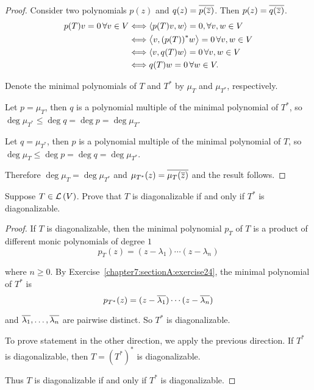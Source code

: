 \begin{proof}
    Consider two polynomials $p(z)$ and $q(z) = \overline{p(\overline{z})}$. Then $p(z) = \overline{q(\overline{z})}$.
    \begin{align*}
        p(T)v = 0\,\forall v\in V & \Longleftrightarrow \left\langle{p(T)v, w}\right\rangle = 0,\forall v, w\in V          \\
                                  & \Longleftrightarrow \left\langle{v, {(p(T))}^{*}w}\right\rangle = 0\,\forall v, w\in V \\
                                  & \Longleftrightarrow \left\langle{v, q(T)w}\right\rangle = 0\,\forall v, w\in V         \\
                                  & \Longleftrightarrow q(T)w = 0\,\forall w\in V.
    \end{align*}

    Denote the minimal polynomials of $T$ and $T^{*}$ by $\mu_{T}$ and $\mu_{T^{*}}$, respectively.

    Let $p = \mu_{T}$, then $q$ is a polynomial multiple of the minimal polynomial of $T^{*}$, so $\deg \mu_{T^{*}}\leq \deg q = \deg p = \deg \mu_{T}$.

    Let $q = \mu_{T^{*}}$, then $p$ is a polynomial multiple of the minimal polynomial of $T$, so $\deg \mu_{T}\leq \deg p = \deg q = \deg \mu_{T^{*}}$.

    Therefore $\deg \mu_{T} = \deg \mu_{T^{*}}$ and $\mu_{T^{*}}(z) = \overline{\mu_{T}(\overline{z})}$ and the result follows.
\end{proof}
\newpage

\begin{exercise}
    Suppose $T \in \mathcal{L}\left({V}\right)$. Prove that $T$ is diagonalizable if and only if $T^{*}$ is diagonalizable.
\end{exercise}

\begin{proof}
    If $T$ is diagonalizable, then the minimal polynomial $p_{T}$ of $T$ is a product of different monic polynomials of degree $1$
    \[
        p_{T}(z) = (z - \lambda_{1})\cdots (z - \lambda_{n})
    \]

    where $n\geq 0$. By Exercise~\ref{chapter7:sectionA:exercise24}, the minimal polynomial of $T^{*}$ is
    \[
        p_{T^{*}}(z) = (z - \overline{\lambda_{1}})\cdots (z - \overline{\lambda_{n}})
    \]

    and $\overline{\lambda_{1}}, \ldots, \overline{\lambda_{n}}$ are pairwise distinct. So $T^{*}$ is diagonalizable.

    To prove statement in the other direction, we apply the previous direction. If $T^{*}$ is diagonalizable, then $T = {(T^{*})}^{*}$ is diagonalizable.

    Thus $T$ is diagonalizable if and only if $T^{*}$ is diagonalizable.
\end{proof}
\newpage

